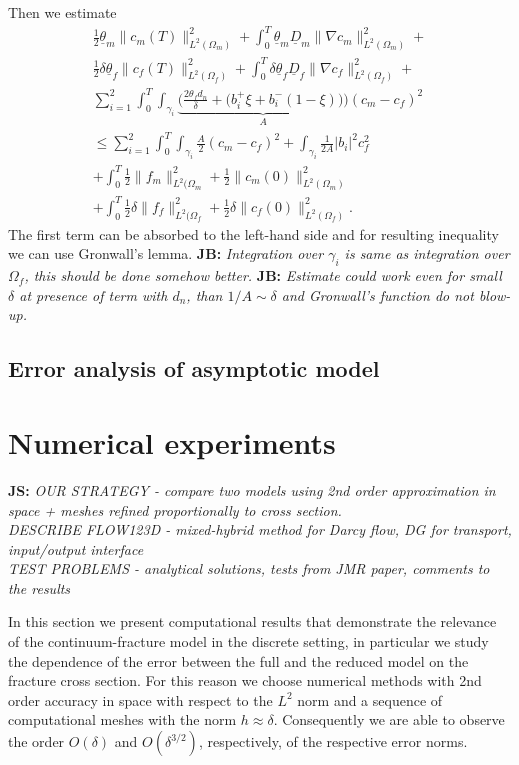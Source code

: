 \documentclass[a4paper]{article}
\def\abs#1{\lvert#1\rvert}
\def\grad{\nabla}
\def\norm#1{\|#1\|}
\def\ul{\underline}
\newcommand{\note}[2]{{\color{blue} \textbf{ #1:} \textit{#2}}}
\begin{document}
Then we estimate
\begin{align*}
  \frac12 \ul{\theta}_m\norm{c_m(T)}_{L^2(\Omega_m)}^2 + \int_0^T \ul{\theta}_m \ul{D}_m \norm{\grad c_m}_{L^2(\Omega_m)}^2 + \\
  \frac12 \delta\ul{\theta}_f\norm{c_f(T)}_{L^2(\Omega_f)}^2 + \int_0^T \delta \ul{\theta}_f \ul{D}_f \norm{\grad c_f}_{L^2(\Omega_f)}^2+\\
   \sum_{i=1}^{2} \int_0^T \int_{\gamma_i} \underbrace{\Big(\frac{2\theta_f d_n}{\delta} + \big(b_i^+ \xi + b_i^-(1-\xi)\big)\Big)}_{A} (c_m-c_f)^2\\
   \le \sum_{i=1}^2 \int_0^T \int_{\gamma_i} \frac{A}{2} (c_m-c_f)^2 + \int_{\gamma_i} \frac{1}{2A}\abs{b_i}^2 c_f^2 \\
   + \int_0^T \frac12\norm{f_m}^2_{L^2(\Omega_m} + \frac12\norm{c_m(0)}^2_{L^2(\Omega_m)}\\
   + \int_0^T \frac12\delta\norm{f_f}^2_{L^2(\Omega_f} + \frac12\delta\norm{c_f(0)}^2_{L^2(\Omega_f)}.
\end{align*}
The first term can be absorbed to the left-hand side and for resulting inequality we can use Gronwall's lemma. 
\note{JB}{Integration over $\gamma_i$ is same as integration over $\Omega_f$, this should be done somehow better.}
\note{JB}{Estimate could work even for small $\delta$ at presence of term with $d_n$, than $1/A \sim \delta$ and Gronwall's function do not blow-up.}



\subsection{Error analysis of asymptotic model}



\section{Numerical experiments}
\label{sc:numerics}

\note{JS}{
OUR STRATEGY - compare two models using 2nd order approximation in space + meshes refined proportionally to cross section.
\\
DESCRIBE FLOW123D - mixed-hybrid method for Darcy flow, DG for transport, input/output interface
\\
TEST PROBLEMS - analytical solutions, tests from JMR paper, comments to the results
}

In this section we present computational results that demonstrate the relevance of the continuum-fracture model in the discrete setting, in particular we study the dependence of the error between the full and the reduced model on the fracture cross section.
For this reason we choose numerical methods with 2nd order accuracy in space with respect to the $L^2$ norm and a sequence of computational meshes with the norm $h\approx\delta$. Consequently we are able to observe the order $O(\delta)$ and $O(\delta^{3/2})$, respectively, of the respective error norms.
\end{document}
